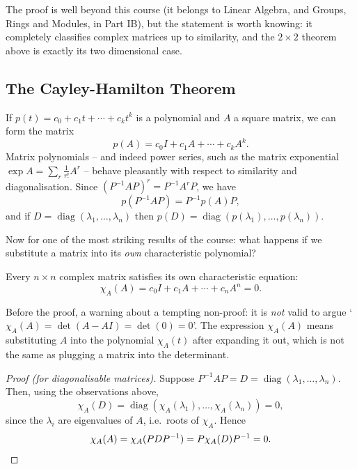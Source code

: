 \documentclass[a4paper]{scrartcl}
\newcommand{\diag}{\operatorname{diag}}
\begin{document}
The proof is well beyond this course (it belongs to Linear Algebra, and Groups, Rings and Modules, in Part IB), but the statement is worth knowing: it completely classifies complex matrices up to similarity, and the $2 \times 2$ theorem above is exactly its two dimensional case.

\subsection{The Cayley-Hamilton Theorem}

If $p(t) = c_0 + c_1 t + \cdots + c_kt^k$ is a polynomial and $A$ a square matrix, we can form the matrix
$$
p(A) = c_0 I + c_1 A + \cdots + c_k A^k.
$$
Matrix polynomials -- and indeed power series, such as the matrix exponential $\exp A = \sum_r \frac{1}{r!}A^r$ -- behave pleasantly with respect to similarity and diagonalisation. Since $(P^{-1}AP)^r = P^{-1}A^rP$, we have
$$
p(P^{-1}AP) = P^{-1}p(A)P,
$$
and if $D = \diag(\lambda_1, \dots, \lambda_n)$ then $p(D) = \diag(p(\lambda_1), \dots, p(\lambda_n))$.

Now for one of the most striking results of the course: what happens if we substitute a matrix into its \emph{own} characteristic polynomial?

\begin{theorem}
	Every $n \times n$ complex matrix satisfies its own characteristic equation:
	$$
	\chi_A(A) = c_0 I + c_1 A + \cdots + c_n A^n = 0.
	$$
\end{theorem}

Before the proof, a warning about a tempting non-proof: it is \emph{not} valid to argue `$\chi_A(A) = \det(A - AI) = \det(0) = 0$'. The expression $\chi_A(A)$ means substituting $A$ into the polynomial $\chi_A(t)$ after expanding it out, which is not the same as plugging a matrix into the determinant.

\begin{proof}[Proof (for diagonalisable matrices)]
	Suppose $P^{-1}AP = D = \diag(\lambda_1, \dots, \lambda_n)$. Then, using the observations above,
	$$
	\chi_A(D) = \diag\left(\chi_A(\lambda_1), \dots, \chi_A(\lambda_n)\right) = 0,
	$$
	since the $\lambda_i$ are eigenvalues of $A$, i.e.\ roots of $\chi_A$. Hence
	$$
	\chi_A(A) = \chi_A(PDP^{-1}) = P \chi_A(D)P^{-1} = 0. \qedhere
	$$
\end{proof}
\end{document}
